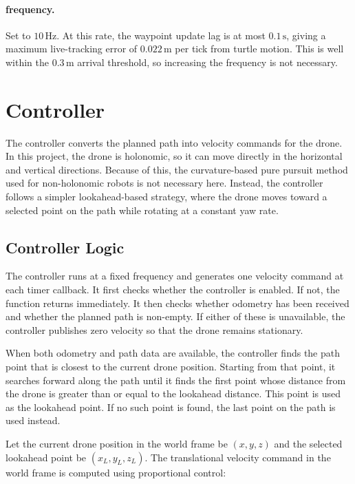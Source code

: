 \documentclass[12pt,twoside,letterpaper]{article}
\begin{document}
\paragraph{frequency.}
Set to $10\,\text{Hz}$. At this rate, the waypoint update lag is at most $0.1\,\text{s}$, giving a maximum live-tracking error of $0.022\,\text{m}$ per tick from turtle motion. This is well within the $0.3\,\text{m}$ arrival threshold, so increasing the frequency is not necessary.



\section{Controller}

The controller converts the planned path into velocity commands for the drone. In this project, the drone is holonomic, so it can move directly in the horizontal and vertical directions. Because of this, the curvature-based pure pursuit method used for non-holonomic robots is not necessary here. Instead, the controller follows a simpler lookahead-based strategy, where the drone moves toward a selected point on the path while rotating at a constant yaw rate.

\subsection{Controller Logic}

The controller runs at a fixed frequency and generates one velocity command at each timer callback. It first checks whether the controller is enabled. If not, the function returns immediately. It then checks whether odometry has been received and whether the planned path is non-empty. If either of these is unavailable, the controller publishes zero velocity so that the drone remains stationary.

When both odometry and path data are available, the controller finds the path point that is closest to the current drone position. Starting from that point, it searches forward along the path until it finds the first point whose distance from the drone is greater than or equal to the lookahead distance. This point is used as the lookahead point. If no such point is found, the last point on the path is used instead.

Let the current drone position in the world frame be $(x,y,z)$ and the selected lookahead point be $(x_L,y_L,z_L)$. The translational velocity command in the world frame is computed using proportional control:
\end{document}
